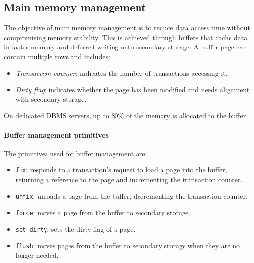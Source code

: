 \subsection{Main memory management}
The objective of main memory management is to reduce data access time without compromising memory stability. 
This is achieved through buffers that cache data in faster memory and deferred writing onto secondary storage.
A buffer page can contain multiple rows and includes:
\begin{itemize}
    \item \textit{Transaction counter}: indicates the number of transactions accessing it.
    \item \textit{Dirty flag}: indicates whether the page has been modified and needs alignment with secondary storage.
\end{itemize}
On dedicated DBMS servers, up to 80\% of the memory is allocated to the buffer.

\paragraph*{Buffer management primitives}
The primitives used for buffer management are: 
\begin{itemize}
    \item \texttt{fix}: responds to a transaction's request to load a page into the buffer, returning a reference to the page and incrementing the transaction counter.
    \item \texttt{unfix}: unloads a page from the buffer, decrementing the transaction counter.
    \item \texttt{force}: moves a page from the buffer to secondary storage.
    \item \texttt{set\_dirty}: sets the dirty flag of a page.
    \item \texttt{flush}: moves pages from the buffer to secondary storage when they are no longer needed.
\end{itemize}

